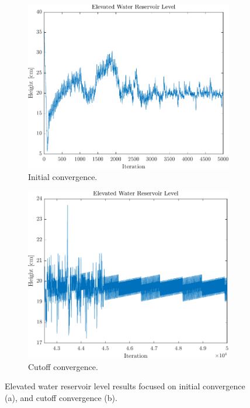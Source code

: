 \begin{figure}
	\centering
	\begin{subfigure}{.5\textwidth}
		\centering
		\includegraphics[width=1\linewidth]{figures/TabularResults3.pdf}
		\caption{Initial convergence.}
		\label{fig:ResultRightZoom}
	\end{subfigure}%
	\begin{subfigure}{.5\textwidth}
		\centering
		\includegraphics[width=1\linewidth]{figures/TabularResults4.pdf}
		\caption{Cutoff convergence.}
		\label{fig:ResultLeftZoom}
	\end{subfigure}
	\caption{Elevated water reservoir level results focused on initial convergence (a), and cutoff convergence (b).}
	\label{fig:ResultZoom}
\end{figure}

